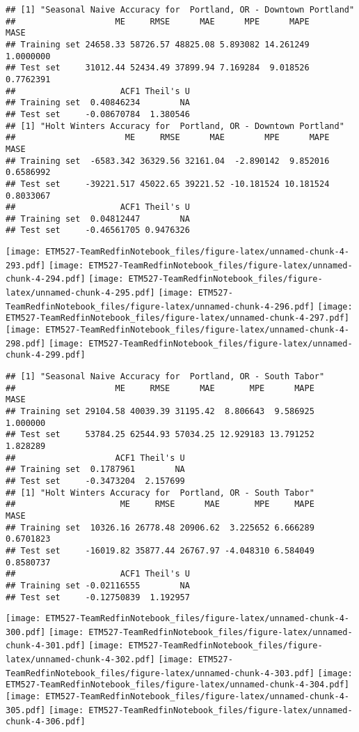 \documentclass[]{article}
\begin{document}
\begin{verbatim}
## [1] "Seasonal Naive Accuracy for  Portland, OR - Downtown Portland"
##                    ME     RMSE      MAE      MPE      MAPE      MASE
## Training set 24658.33 58726.57 48825.08 5.893082 14.261249 1.0000000
## Test set     31012.44 52434.49 37899.94 7.169284  9.018526 0.7762391
##                     ACF1 Theil's U
## Training set  0.40846234        NA
## Test set     -0.08670784  1.380546
## [1] "Holt Winters Accuracy for  Portland, OR - Downtown Portland"
##                      ME     RMSE      MAE        MPE      MAPE      MASE
## Training set  -6583.342 36329.56 32161.04  -2.890142  9.852016 0.6586992
## Test set     -39221.517 45022.65 39221.52 -10.181524 10.181524 0.8033067
##                     ACF1 Theil's U
## Training set  0.04812447        NA
## Test set     -0.46561705 0.9476326
\end{verbatim}

\texttt{[image: ETM527-TeamRedfinNotebook\_files/figure-latex/unnamed-chunk-4-293.pdf]}
\texttt{[image: ETM527-TeamRedfinNotebook\_files/figure-latex/unnamed-chunk-4-294.pdf]}
\texttt{[image: ETM527-TeamRedfinNotebook\_files/figure-latex/unnamed-chunk-4-295.pdf]}
\texttt{[image: ETM527-TeamRedfinNotebook\_files/figure-latex/unnamed-chunk-4-296.pdf]}
\texttt{[image: ETM527-TeamRedfinNotebook\_files/figure-latex/unnamed-chunk-4-297.pdf]}
\texttt{[image: ETM527-TeamRedfinNotebook\_files/figure-latex/unnamed-chunk-4-298.pdf]}
\texttt{[image: ETM527-TeamRedfinNotebook\_files/figure-latex/unnamed-chunk-4-299.pdf]}

\begin{verbatim}
## [1] "Seasonal Naive Accuracy for  Portland, OR - South Tabor"
##                    ME     RMSE      MAE       MPE      MAPE     MASE
## Training set 29104.58 40039.39 31195.42  8.806643  9.586925 1.000000
## Test set     53784.25 62544.93 57034.25 12.929183 13.791252 1.828289
##                    ACF1 Theil's U
## Training set  0.1787961        NA
## Test set     -0.3473204  2.157699
## [1] "Holt Winters Accuracy for  Portland, OR - South Tabor"
##                     ME     RMSE      MAE       MPE     MAPE      MASE
## Training set  10326.16 26778.48 20906.62  3.225652 6.666289 0.6701823
## Test set     -16019.82 35877.44 26767.97 -4.048310 6.584049 0.8580737
##                     ACF1 Theil's U
## Training set -0.02116555        NA
## Test set     -0.12750839  1.192957
\end{verbatim}

\texttt{[image: ETM527-TeamRedfinNotebook\_files/figure-latex/unnamed-chunk-4-300.pdf]}
\texttt{[image: ETM527-TeamRedfinNotebook\_files/figure-latex/unnamed-chunk-4-301.pdf]}
\texttt{[image: ETM527-TeamRedfinNotebook\_files/figure-latex/unnamed-chunk-4-302.pdf]}
\texttt{[image: ETM527-TeamRedfinNotebook\_files/figure-latex/unnamed-chunk-4-303.pdf]}
\texttt{[image: ETM527-TeamRedfinNotebook\_files/figure-latex/unnamed-chunk-4-304.pdf]}
\texttt{[image: ETM527-TeamRedfinNotebook\_files/figure-latex/unnamed-chunk-4-305.pdf]}
\texttt{[image: ETM527-TeamRedfinNotebook\_files/figure-latex/unnamed-chunk-4-306.pdf]}
\end{document}
